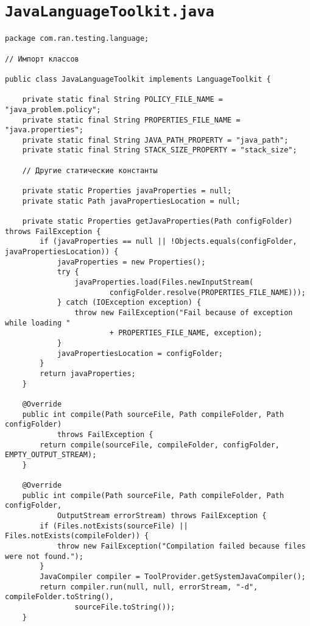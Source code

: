 \section*{\texttt{JavaLanguageToolkit.java}}
\begin{verbatim}
package com.ran.testing.language;

// Импорт классов

public class JavaLanguageToolkit implements LanguageToolkit {
    
    private static final String POLICY_FILE_NAME = "java_problem.policy";
    private static final String PROPERTIES_FILE_NAME = "java.properties";
    private static final String JAVA_PATH_PROPERTY = "java_path";
    private static final String STACK_SIZE_PROPERTY = "stack_size";
    
    // Другие статические константы
    
    private static Properties javaProperties = null;
    private static Path javaPropertiesLocation = null;
    
    private static Properties getJavaProperties(Path configFolder) throws FailException {
        if (javaProperties == null || !Objects.equals(configFolder, javaPropertiesLocation)) {
            javaProperties = new Properties();
            try {
                javaProperties.load(Files.newInputStream(
                        configFolder.resolve(PROPERTIES_FILE_NAME)));
            } catch (IOException exception) {
                throw new FailException("Fail because of exception while loading "
                        + PROPERTIES_FILE_NAME, exception);
            }
            javaPropertiesLocation = configFolder;
        }
        return javaProperties;
    }
    
    @Override
    public int compile(Path sourceFile, Path compileFolder, Path configFolder)
            throws FailException {
        return compile(sourceFile, compileFolder, configFolder, EMPTY_OUTPUT_STREAM);
    }

    @Override
    public int compile(Path sourceFile, Path compileFolder, Path configFolder,
            OutputStream errorStream) throws FailException {
        if (Files.notExists(sourceFile) || Files.notExists(compileFolder)) {
            throw new FailException("Compilation failed because files were not found.");
        }
        JavaCompiler compiler = ToolProvider.getSystemJavaCompiler();
        return compiler.run(null, null, errorStream, "-d", compileFolder.toString(),
                sourceFile.toString());
    }


\end{verbatim}
